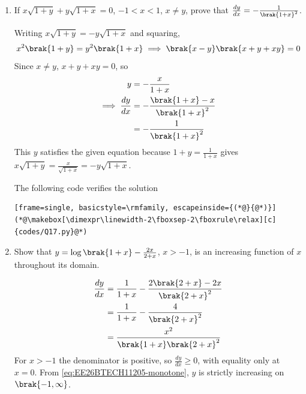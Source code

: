 \begin{enumerate}[label=\thesubsection.\arabic*, ref=\thesubsection.\theenumi, itemsep=3ex]
\medskip
The following code verifies the solution
\begin{lstlisting}[frame=single, basicstyle=\rmfamily, escapeinside={(*@}{@*)}]
(*@\makebox[\dimexpr\linewidth-2\fboxsep-2\fboxrule\relax][c]{codes/Q16.py}@*)
\end{lstlisting}

\item
If $x\sqrt{1+y} + y\sqrt{1+x} = 0$, $-1<x<1$, $x \neq y$, prove that $\frac{dy}{dx} = -\frac{1}{\brak{1+x}^2}$.

\medskip
\solution Writing $x\sqrt{1+y} = -y\sqrt{1+x}$ and squaring,
\begin{align}
	x^2\brak{1+y} = y^2\brak{1+x} \implies \brak{x-y}\brak{x+y+xy} = 0
\end{align}
Since $x \neq y$, $x + y + xy = 0$, so
\begin{align}
	y &= -\frac{x}{1+x} \notag
	\\
	\implies \frac{dy}{dx} &= -\frac{\brak{1+x} - x}{\brak{1+x}^2} \notag
	\\
	&= -\frac{1}{\brak{1+x}^2}
\end{align}
This $y$ satisfies the given equation because $1 + y = \frac{1}{1+x}$ gives $x\sqrt{1+y} = \frac{x}{\sqrt{1+x}} = -y\sqrt{1+x}$.

\medskip
The following code verifies the solution
\begin{lstlisting}[frame=single, basicstyle=\rmfamily, escapeinside={(*@}{@*)}]
(*@\makebox[\dimexpr\linewidth-2\fboxsep-2\fboxrule\relax][c]{codes/Q17.py}@*)
\end{lstlisting}

\item
Show that $y = \log\brak{1+x} - \frac{2x}{2+x}$, $x>-1$, is an increasing function of $x$ throughout its domain.

\medskip
\solution \begin{align}
	\frac{dy}{dx} &= \frac{1}{1+x} - \frac{2\brak{2+x}-2x}{\brak{2+x}^2} \notag
	\\
	&= \frac{1}{1+x} - \frac{4}{\brak{2+x}^2} \notag
	\\
	&= \frac{x^2}{\brak{1+x}\brak{2+x}^2}
\end{align}
For $x>-1$ the denominator is positive, so $\frac{dy}{dx} \ge 0$, with equality only at $x=0$. From \eqref{eq:EE26BTECH11205-monotone}, $y$ is strictly increasing on $\brak{-1,\infty}$.


\end{enumerate}
